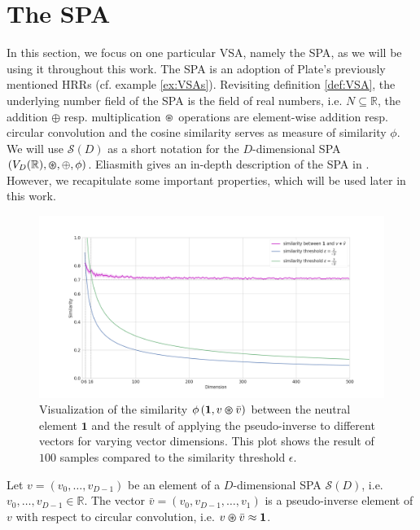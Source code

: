 \section{The \acl{SPA}}
\label{sec:spa}

In this section, we focus on one particular \ac{VSA}, namely the \ac{SPA}, as we will be using it throughout this work.
The \ac{SPA} is an adoption of Plate's previously mentioned \acp{HRR} (cf. example \ref{ex:VSAs}).
Revisiting definition \ref{def:VSA}, the underlying number field of the \ac{SPA} is the field of real numbers, i.e. $N \subseteq \mathbb{R}$, the addition $\oplus$ resp. multiplication $\varoast$ operations are element-wise addition resp. circular convolution and the cosine similarity serves as measure of similarity $\phi$.
We will use $\mathcal{S}(D)$ as a short notation for the $D$-dimensional \ac{SPA} $(V_{D}(\mathbb{R}), \varoast, \oplus, \phi)$.
Eliasmith gives an in-depth description of the \ac{SPA} in \cite{Eliasmith2013}.
However, we recapitulate some important properties, which will be used later in this work.
\begin{figure}[t!]
	\centering
	\includegraphics[width=1.0\textwidth]{imgs/pseudo_inverse_tsplot.png}
	\caption{Visualization of the similarity $\phi\left(\mathbf{1}, v \varoast \bar{v}\right)$ between the neutral element $\mathbf{1}$ and the result of applying the pseudo-inverse to different vectors for varying vector dimensions. This plot shows the result of $100$ samples compared to the similarity threshold $\epsilon$.}
	\label{fig:pseudo_inv}
\end{figure}
\begin{lemma}
	\label{lemma:spa_pseudo_inv}
	Let $v=\left(v_0, \ldots, v_{D-1}\right)$ be an element of a $D$-dimensional \ac{SPA} $\mathcal{S}(D)$, i.e. $v_0, \ldots, v_{D-1} \in \mathbb{R}$.
	The vector $\bar{v}=\left(v_0, v_{D-1}, \ldots, v_{1}\right)$ is a pseudo-inverse element of $v$ with respect to circular convolution, i.e. $v \varoast \bar{v} \approx \mathbf{1}$.
\end{lemma}
